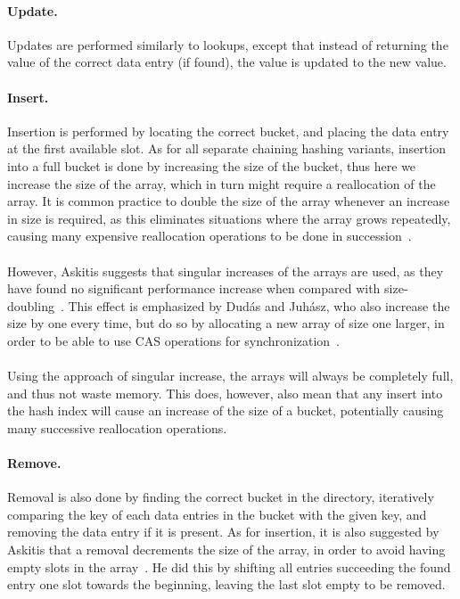 \documentclass[11pt]{report} %
\begin{document}
\paragraph{Update.} Updates are performed similarly to lookups, except that instead of returning the value of the correct data entry (if found), the value is updated to the new value. 

\paragraph{Insert.} Insertion is performed by locating the correct bucket, and placing the data entry at the first available slot. As for all separate chaining hashing variants, insertion into a full bucket is done by increasing the size of the bucket, thus here we increase the size of the array, which in turn might require a reallocation of the array. It is common practice to double the size of the array whenever an increase in size is required, as this eliminates situations where the array grows repeatedly, causing many expensive reallocation operations to be done in succession~\cite{DPH90}. \\
\\
However, Askitis suggests that singular increases of the arrays are used, as they have found no significant performance increase when compared with size-doubling~\cite{NA09}. This effect is emphasized by Dudás and Juhász, who also increase the size by one every time, but do so by allocating a new array of size one larger, in order to be able to use CAS operations for synchronization~\cite{ADSJ13}. \\
\\
Using the approach of singular increase, the arrays will always be completely full, and thus not waste  memory. This does, however, also mean that any insert into the hash index will cause an increase of the size of a bucket, potentially causing many successive reallocation operations. 

\paragraph{Remove.} Removal is also done by finding the correct bucket in the directory, iteratively comparing the key of each data entries in the bucket with the given key, and removing the data entry if it is present. As for insertion, it is also suggested by Askitis that a removal decrements the size of the array, in order to avoid having empty slots in the array~\cite{NA09}. He did this by shifting all entries succeeding the found entry one slot towards the beginning, leaving the last slot empty to be removed. 
\end{document}
